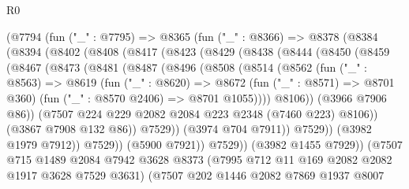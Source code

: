 \begin{lexlean}{R0}
\begin{coremodule}
      (@7794
        (fun ("_" : @7795) =>
        @8365
          (fun ("_" : @8366) =>
          @8378
            (@8384
              (@8394
                (@8402
                  (@8408
                    (@8417
                      (@8423
                        (@8429
                          (@8438
                            (@8444
                              (@8450
                                (@8459
                                  (@8467
                                    (@8473
                                      (@8481
                                        (@8487
                                          (@8496
                                            (@8508
                                              (@8514
                                                (@8562
                                                  (fun ("_" : @8563) =>
                                                  @8619
                                                    (fun ("_" : @8620) =>
                                                    @8672
                                                      (fun ("_" : @8571) => @8701 @360)
                                                      (fun ("_" : @8570 @2406) => @8701 @1055))))
                                                @8106))
                                            (@3966 @7906 @86))
                                          (@7507
                                            @224
                                            @229
                                            @2082
                                            @2084
                                            @223
                                            @2348
                                            (@7460 @223)
                                            @8106))
                                        (@3867 @7908 @132 @86))
                                      @7529))
                                  (@3974 @704 @7911))
                                @7529))
                            (@3982 @1979 @7912))
                          @7529))
                      (@5900 @7921))
                    @7529))
                (@3982 @1455 @7929))
              (@7507
                @715
                @1489
                @2084
                @7942
                @3628
                @8373
                (@7995 @712 @11 @169 @2082 @2082 @1917 @3628 @7529 @3631)
                (@7507
                  @202
                  @1446
                  @2082
                  @7869
                  @1937
                  @8007

\end{coremodule}
\end{lexlean}
